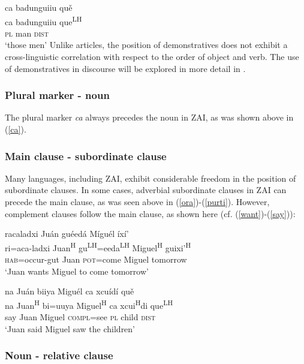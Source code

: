 \ea\label{ca2}
\glll ca badunguiiu qu\v{e} \\
ca badunguiiu que\textsuperscript{LH} \\
\textsc{pl} man \textsc{dist} \\
\glt `those men'
\z
Unlike articles, the position of demonstratives does not exhibit a cross-linguistic correlation with respect to the order of object and verb. The use of demonstratives in discourse will be explored in more detail in .


\subsubsection{Plural marker - noun}

The plural marker \textit{ca} always precedes the noun in ZAI, as was shown above in (\ref{ca}). 


\subsubsection{Main clause - subordinate clause}

Many languages, including ZAI, exhibit considerable freedom in the position of subordinate clauses. In some cases, adverbial subordinate clauses in ZAI can precede the main clause, as was seen above in (\ref{ora})-(\ref{purti}). However, complement clauses follow the main clause, as shown here (cf. (\ref{want})-(\ref{say})): 


\ea\label{want}
\glll racaladxi Ju\'{a}n gu\'{e}ed\'{a} M\'{i}gu\'{e}l \'{i}x\'{i}' \\
ri=aca-ladxi Juan\textsuperscript{H} gu\textsuperscript{LH}=eeda\textsuperscript{LH} Miguel\textsuperscript{H}  guixi'\textsuperscript{H}  \\
\textsc{hab}=occur-gut Juan \textsc{pot}=come Miguel tomorrow \\
\glt `Juan wants Miguel to come tomorrow' 
\z

\ea\label{say}
\glll na Ju\'{a}n biiya Migu\'{e}l ca xcu\'{i}d\'{i} qu\v{e} \\
na Juan\textsuperscript{H} bi=uuya Miguel\textsuperscript{H} ca xcui\textsuperscript{H}di que\textsuperscript{LH} \\
say Juan Miguel \textsc{compl}=see \textsc{pl} child \textsc{dist} \\
\glt `Juan said Miguel saw the children' 
\z

	
	
\subsubsection{Noun - relative clause}

